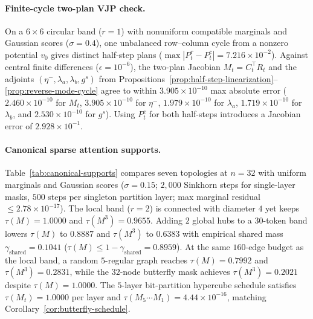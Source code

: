 \documentclass[10pt]{article}
\begin{document}
\paragraph{Finite-cycle two-plan VJP check.}
On a $6 \times 6$ circular band ($r=1$) with nonuniform compatible marginals and Gaussian scores ($\sigma=0.4$), one unbalanced row--column cycle from a nonzero potential $v_0$ gives distinct half-step plans ($\max|P_t^r - P_t^c| = 7.216 \times 10^{-2}$). Against central finite differences ($\epsilon = 10^{-6}$), the two-plan Jacobian $M_t = C_t^\top R_t$ and the adjoints $(\eta^-, \lambda_a, \lambda_b, g^s)$ from Propositions~\ref{prop:half-step-linearization}--\ref{prop:reverse-mode-cycle} agree to within $3.905 \times 10^{-10}$ max absolute error ($2.460\times 10^{-10}$ for $M_t$, $3.905\times 10^{-10}$ for $\eta^-$, $1.979\times 10^{-10}$ for $\lambda_a$, $1.719\times 10^{-10}$ for $\lambda_b$, and $2.530\times 10^{-10}$ for $g^s$). Using $P_t^c$ for both half-steps introduces a Jacobian error of $2.928 \times 10^{-1}$.

\paragraph{Canonical sparse attention supports.}
Table~\ref{tab:canonical-supports} compares seven topologies at $n=32$ with uniform marginals and Gaussian scores ($\sigma = 0.15$; $2{,}000$ Sinkhorn steps for single-layer masks, $500$ steps per singleton partition layer; max marginal residual $\le 2.78 \times 10^{-17}$). The local band ($r=2$) is connected with diameter $4$ yet keeps $\tau(M) = 1.0000$ and $\tau(M^3) = 0.9655$. Adding $2$ global hubs to a $30$-token band lowers $\tau(M)$ to $0.8887$ and $\tau(M^3)$ to $0.6383$ with empirical shared mass $\gamma_{\mathrm{shared}} = 0.1041$ ($\tau(M) \le 1 - \gamma_{\mathrm{shared}} = 0.8959$). At the same $160$-edge budget as the local band, a random $5$-regular graph reaches $\tau(M) = 0.7992$ and $\tau(M^3) = 0.2831$, while the $32$-node butterfly mask achieves $\tau(M^3) = 0.2021$ despite $\tau(M) = 1.0000$. The $5$-layer bit-partition hypercube schedule satisfies $\tau(M_t) = 1.0000$ per layer and $\tau(M_5 \cdots M_1) = 4.44 \times 10^{-16}$, matching Corollary~\ref{cor:butterfly-schedule}.
\end{document}
